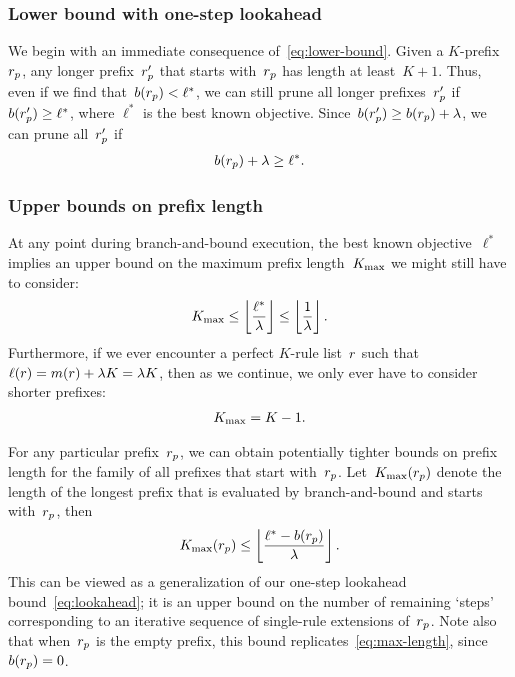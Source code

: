 \subsubsection{Lower bound with one-step lookahead}

We begin with an immediate consequence of~\eqref{eq:lower-bound}.
%
Given a $K$-prefix~${r_p}$, any longer prefix~${r'_p}$ that starts
with~${r_p}$ has length at least~${K+1}$.
%
Thus, even if we find that~${b({r_p}) < \ell^*}$, we can still prune all longer
prefixes~${r'_p}$ if ${b({r'_p}) \ge \ell^*}$,
where $\ell^*$ is the best known objective.
%
Since~${b({r'_p}) \ge b({r_p}) + {\lambda}}$,
we can prune all~${r'_p}$ if
\begin{align}
 b(\Prefix) + \Reg \ge \ell^*.
\label{eq:lookahead}
\end{align}


\subsubsection{Upper bounds on prefix length}
\label{sec:ub-prefix-length}

At any point during branch-and-bound execution, the best known objective~$\ell^*$
implies an upper bound on the maximum prefix length~${K_{\text{max}}}$ we might still have to consider:
\begin{align}
\MaxLength \le \left\lfloor \frac{\ell^*}{\Reg} \right\rfloor
\le \left\lfloor \frac{1}{\Reg} \right\rfloor.
\label{eq:max-length}
\end{align}
Furthermore, if we ever encounter a perfect $K$-rule list~${r}$
such that~${\ell({r}) = m({r}) + {\lambda} K = {\lambda} K}$, then as we continue,
we only ever have to consider shorter prefixes:
\begin{align}
\MaxLength = K - 1.
\label{eq:max-length-perfect}
\end{align}

For any particular prefix~${r_p}$, we can obtain potentially tighter bounds on
prefix length for the family of all prefixes that start with~${r_p}$.
%
Let~${K_{\text{max}}}({r_p})$ denote the length of the longest prefix that is
evaluated by branch-and-bound and starts with~${r_p}$, then
\begin{align}
\MaxLength(\Prefix) \le \left\lfloor \frac{\ell^* - b(\Prefix)}{\Reg} \right\rfloor.
\label{eq:max-length-prefix}
\end{align}
This can be viewed as a generalization of our one-step lookahead
bound~\eqref{eq:lookahead}; it is an upper bound on the number of remaining `steps'
corresponding to an iterative sequence of single-rule extensions of~${r_p}$.
%
Note also that when~${r_p}$ is the empty prefix,
this bound replicates~\eqref{eq:max-length}, since~${b({r_p}) = 0}$.

